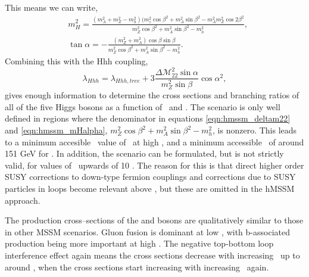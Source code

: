 This means we can write,
\begin{equation}
\label{eqn:hmssm_mHalpha}
\begin{split}
&m^2_H = \frac{(m_A^2+m_Z^2-m_h^2)(m_z^2\cos{\beta}^2+m_A^2\sin{\beta}^2 - m_A^2m_Z^2\cos{2\beta}^2}{m_Z^2\cos{\beta}^2+m_A^2\sin{\beta}^2-m_h^2},\\
&\tan{\alpha} = -\frac{(m_Z^2+m_A^2)\cos{\beta}\sin{\beta}}{m_Z^2\cos{\beta}^2+m_A^2\sin{\beta}^2-m_h^2}.
\end{split}
\end{equation}
Combining this with the Hhh coupling,
\begin{equation}
\label{eqn:hmssm_Hhh}
\lambda_{Hhh} = \lambda_{Hhh,tree} + 3\frac{\Delta\mathcal{M}^2_{22}\sin{\alpha}}{m_Z^2\sin{\beta}}\cos{\alpha}^2,
\end{equation}
gives enough information to determine the cross sections and branching
ratios of all of the five Higgs bosons as a function of \mA~and \tanb. The scenario
is only well defined in regions where the denominator in equations
\ref{eqn:hmssm_deltam22} and \ref{eqn:hmssm_mHalpha}, $m_Z^2\cos{\beta}^2+m_A^2\sin{\beta}^2 - m_h^2$, is nonzero. 
This leads to a minimum accesible \mA~value of \mh~at high \tanb, and
a minimum accessible \mA~of around 151 GeV for . In addition, the scenario
can be formulated, but is not strictly valid, for values of \tanb~upwards of 10 \cite{CMS-PAS-HIG-16-007}.
The reason for this is that direct higher order SUSY corrections to down-type
fermion couplings and corrections due to SUSY particles in loops become relevant
above , but these are omitted in the hMSSM approach.


The production cross--sections of the \PHiggs and \PHiggsps bosons are
qualitatively similar to those in other MSSM scenarios. Gluon fusion is dominant
at low \tanb, with b-associated production being more important at high \tanb. The
negative top-bottom loop interference effect again means the cross sections decrease with increasing 
\tanb~up to around , when the cross sections start increasing with increasing \tanb~again.

